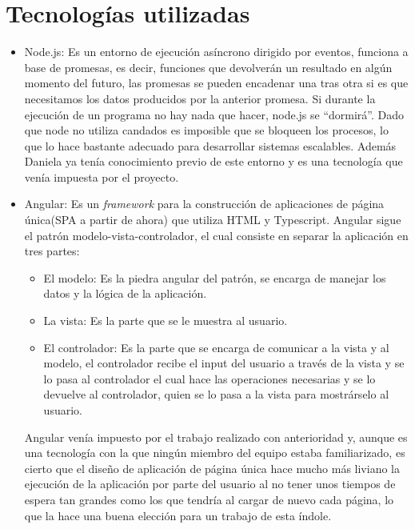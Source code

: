\documentclass[11pt]{article}
\begin{document}
\section{Tecnologías utilizadas}
\begin{itemize}
	\item Node.js: Es un entorno de ejecución asíncrono dirigido por eventos, funciona a base de promesas, es decir, funciones que devolverán un resultado en algún momento del futuro, las promesas se pueden encadenar una tras otra si es que necesitamos los datos producidos por la anterior promesa. Si durante la ejecución de un programa no hay nada que hacer, node.js se “dormirá”. 
	Dado que node no utiliza candados es imposible que se bloqueen los procesos, lo que lo hace bastante adecuado para desarrollar sistemas escalables. Además Daniela ya tenía conocimiento previo de este entorno y es una tecnología que venía impuesta por el proyecto.
	
	\item Angular: Es un \emph{framework} para la construcción de aplicaciones de página única(SPA a partir de ahora) que utiliza HTML y Typescript. Angular sigue el patrón modelo-vista-controlador, el cual consiste en separar la aplicación en tres partes:
	\begin{itemize}
		\item El modelo: Es la piedra angular del patrón, se encarga de manejar los datos y la lógica de la aplicación.
		\item La vista: Es la parte que se le muestra al usuario.
		\item El controlador: Es la parte que se encarga de comunicar a la vista y al modelo, el controlador recibe el input del usuario a través de la vista y se lo pasa al controlador el cual hace las operaciones necesarias y se lo devuelve al controlador, quien se lo pasa a la vista para mostrárselo al usuario.
	\end{itemize}
	
	
	Angular venía impuesto por el trabajo realizado con anterioridad y, aunque es una tecnología con la que ningún miembro del equipo  estaba familiarizado, es cierto que el diseño de aplicación de página única hace mucho más liviano la ejecución de la aplicación por parte del usuario al no tener unos tiempos de espera tan grandes como los que tendría al cargar de nuevo cada página, lo que la hace una buena elección para un trabajo de esta índole.
	

\end{itemize}
\end{document}
